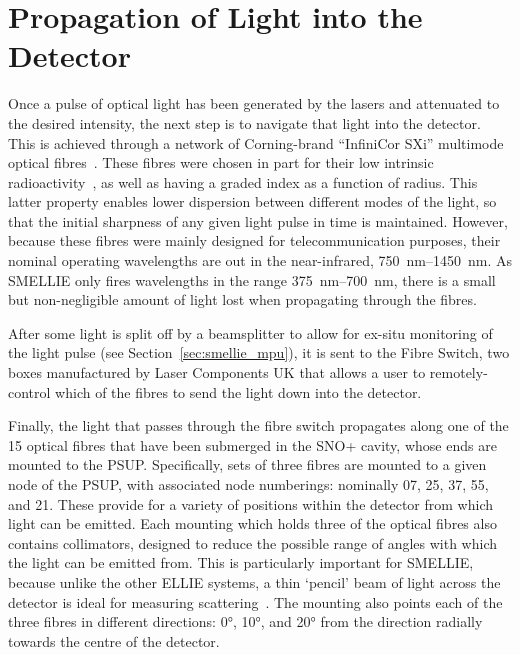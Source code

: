 \section{Propagation of Light into the Detector}\label{sec:smellie_fibres}
Once a pulse of optical light has been generated by the lasers and attenuated to the desired intensity, the next step is to navigate that light into the detector. This is achieved through a network of Corning-brand ``InfiniCor SXi'' multimode optical fibres~\cite{corningCorningInfinicor502007}. %
These fibres were chosen in part for their low intrinsic radioactivity~\cite{clarkELLIEFibreRadioactivity2011}, %
as well as having a graded index as a function of radius. This latter property enables lower dispersion between different modes of the light, so that the initial sharpness of any given light pulse in time is maintained. However, because these fibres were mainly designed for telecommunication purposes, their nominal operating wavelengths are out in the near-infrared, \SIrange{750}{1450}{\nm}. As SMELLIE only fires wavelengths in the range \SIrange{375}{700}{\nm}, there is a small but non-negligible amount of light lost when propagating through the fibres.

After some light is split off by a beamsplitter to allow for ex-situ monitoring of the light pulse (see Section~\ref{sec:smellie_mpu}), it is sent to the Fibre Switch, two boxes manufactured by Laser Components UK that allows a user to remotely-control which of the fibres to send the light down into the detector.

Finally, the light that passes through the fibre switch propagates along one of the 15 optical fibres that have been submerged in the SNO+ cavity, whose ends are mounted to the PSUP. Specifically, sets of three fibres are mounted to a given node of the PSUP, with associated node numberings: nominally 07, 25, 37, 55, and 21. These provide for a variety of positions within the detector from which light can be emitted. Each mounting which holds three of the optical fibres also contains collimators, designed to reduce the possible range of angles with which the light can be emitted from. This is particularly important for SMELLIE, because unlike the other ELLIE systems, a thin `pencil' beam of light across the detector is ideal for measuring scattering~\cite{majumdarMeasurementOpticalScattering2015}. %
The mounting also points each of the three fibres in different directions: \ang{0}, \ang{10}, and \ang{20} from the direction radially towards the centre of the detector.

